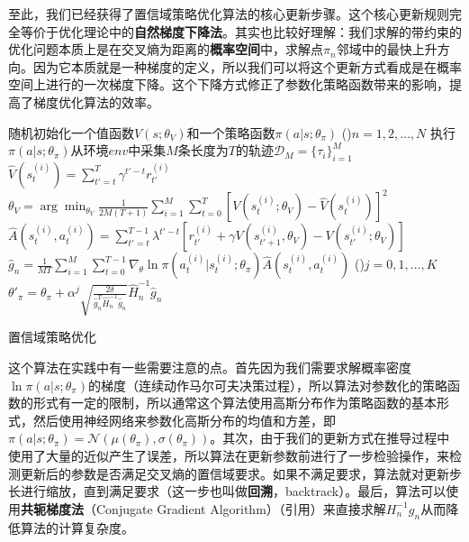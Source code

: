 至此，我们已经获得了置信域策略优化算法的核心更新步骤。这个核心更新规则完全等价于优化理论中的\textbf{自然梯度下降法}\cite{amari1998natural}。其实也比较好理解：我们求解的带约束的优化问题本质上是在交叉熵为距离的\textbf{概率空间}中，求解点$\pi_n$邻域中的最快上升方向。因为它本质就是一种梯度的定义，所以我们可以将这个更新方式看成是在概率空间上进行的一次梯度下降。这个下降方式修正了参数化策略函数带来的影响，提高了梯度优化算法的效率。

\begin{algorithm}[htbp]
    \LinesNumbered
    随机初始化一个值函数$V(s; \theta_V)$和一个策略函数$\pi(a \vert s; \theta_\pi)$\;
    \For(){$n = 1,2, \ldots, N$}{
        执行$\pi(a \vert s; \theta_\pi)$从环境$env$中采集$M$条长度为$T$的轨迹$\mathcal{D}_M=\{\tau_i\}^{M}_{i=1}$\;
        $\hat V(s^{(i)}_t) = \sum^{T}_{t' = t} \gamma^{t'-t}r^{(i)}_{t'}$\;
        $\theta_V = \arg\min_{\theta_V} \frac{1}{2M(T+1)} \sum^{M}_{i=1}\sum^{T}_{t=0} [V(s^{(i)}_t; \theta_V) - \hat V(s^{(i)}_t)]^2$\;
        $\hat A(s^{(i)}_t, a^{(i)}_t) = \sum^{T-1}_{t' = t} \lambda^{t' - t}[r^{(i)}_{t'} + \gamma V(s^{(i)}_{t'+1}, \theta_V) - V(s^{(i)}_{t'}; \theta_V)]$\;
        $\hat g_n = \frac{1}{MT} \sum^{M}_{i=1} \sum^{T-1}_{t=0}\nabla_{\theta} \ln \pi(a^{(i)}_t \vert s^{(i)}_t; \theta_\pi) \hat A(s^{(i)}_t, a^{(i)}_t)$\;
        \For(){$j = 0, 1, \ldots, K$}{
            $\theta'_{\pi} = \theta_{\pi} + \alpha^j \sqrt{\frac{2\delta}{\hat g^T_n \hat H^{-1}_n \hat g_n}} \hat H^{-1}_n \hat g_n$\;
        }
    }
    \caption{置信域策略优化}
\end{algorithm}

这个算法在实践中有一些需要注意的点。首先因为我们需要求解概率密度$\ln \pi(a \vert s; \theta_\pi)$的梯度（连续动作马尔可夫决策过程），所以算法对参数化的策略函数的形式有一定的限制，所以通常这个算法使用高斯分布作为策略函数的基本形式，然后使用神经网络来参数化高斯分布的均值和方差，即$\pi(a \vert s; \theta_\pi) = \mathcal{N}(\mu(\theta_\pi), \sigma(\theta_\pi))$。其次，由于我们的更新方式在推导过程中使用了大量的近似产生了误差，所以算法在更新参数前进行了一步检验操作，来检测更新后的参数是否满足交叉熵的置信域要求。如果不满足要求，算法就对更新步长进行缩放，直到满足要求（这一步也叫做\textbf{回溯}，backtrack）。最后，算法可以使用\textbf{共轭梯度法}\cite{shewchuk1994introduction}（Conjugate Gradient Algorithm）（引用）来直接求解$H_n^{-1}g_n$从而降低算法的计算复杂度。

